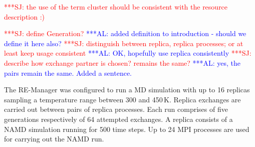 \documentclass{rspublic}
\newcommand{\alnote}[1]{ {\textcolor{blue} { ***AL: #1 }}}
\newcommand{\jhanote}[1]{ {\textcolor{red} { ***SJ: #1 }}}
\newcommand{\alnote}[1]{}
\newcommand{\jhanote}[1]{}
\begin{document}
\jhanote{the use of the term cluster should be consistent with the
  resource description :)}




\jhanote{define Generation?}  \alnote{added definition to introduction
  - should we define it here also?}  \jhanote{distinguish between
  replica, replica processes; or at least keep usage consistent}
\alnote{OK, hopefully use replica consistently} \jhanote{describe how
  exchange partner is chosen? remains the same?}\alnote{yes, the pairs
  remain the same. Added a sentence.}

The RE-Manager was configured to run a MD simulation with up to 16
replicas sampling a temperature range between 300 and
450\,K. Replica exchanges are carried out between pairs of replica
processes. Each run comprises of five generations respectively of 64
attempted exchanges.  A replica consists of a NAMD simulation
running for 500 time steps. Up to 24 MPI processes are used for
carrying out the NAMD run.
\end{document}
